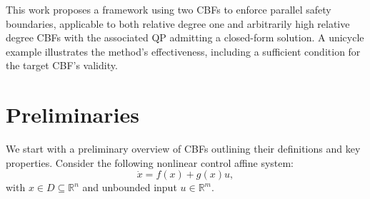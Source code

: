 \documentclass[letterpaper, 10 pt, conference]{ieeeconf}
\newcommand{\TODO}[1]{{\color{black}#1}}
\begin{document}
{%


This work proposes a framework using two CBFs to enforce parallel safety boundaries, applicable to both relative degree one and arbitrarily high relative degree CBFs with the associated QP admitting a closed-form solution. A unicycle example illustrates the method’s effectiveness, including a sufficient condition for the target CBF's validity.
}

\section{Preliminaries} \label{prelim}

We start with a preliminary overview of CBFs \cite{ames2019cbf_theory} outlining their definitions and key properties. Consider the following nonlinear control affine system:
\begin{equation} \label{affine}
    \dot{x} = f(x) + g(x)u,
\end{equation}
with $x \in D \subseteq\mathbb{R}^{n}$ and \TODO{unbounded input} $u \in \mathbb{R}^{m}$.
\end{document}
